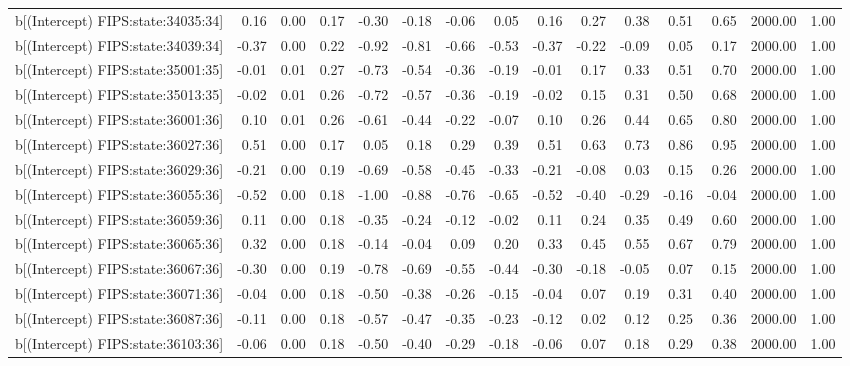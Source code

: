 \begin{table}[ht]
\begin{tabular}{rrrrrrrrrrrrrrr}
  b[(Intercept) FIPS:state:34035:34] & 0.16 & 0.00 & 0.17 & -0.30 & -0.18 & -0.06 & 0.05 & 0.16 & 0.27 & 0.38 & 0.51 & 0.65 & 2000.00 & 1.00 \\ 
  b[(Intercept) FIPS:state:34039:34] & -0.37 & 0.00 & 0.22 & -0.92 & -0.81 & -0.66 & -0.53 & -0.37 & -0.22 & -0.09 & 0.05 & 0.17 & 2000.00 & 1.00 \\ 
  b[(Intercept) FIPS:state:35001:35] & -0.01 & 0.01 & 0.27 & -0.73 & -0.54 & -0.36 & -0.19 & -0.01 & 0.17 & 0.33 & 0.51 & 0.70 & 2000.00 & 1.00 \\ 
  b[(Intercept) FIPS:state:35013:35] & -0.02 & 0.01 & 0.26 & -0.72 & -0.57 & -0.36 & -0.19 & -0.02 & 0.15 & 0.31 & 0.50 & 0.68 & 2000.00 & 1.00 \\ 
  b[(Intercept) FIPS:state:36001:36] & 0.10 & 0.01 & 0.26 & -0.61 & -0.44 & -0.22 & -0.07 & 0.10 & 0.26 & 0.44 & 0.65 & 0.80 & 2000.00 & 1.00 \\ 
  b[(Intercept) FIPS:state:36027:36] & 0.51 & 0.00 & 0.17 & 0.05 & 0.18 & 0.29 & 0.39 & 0.51 & 0.63 & 0.73 & 0.86 & 0.95 & 2000.00 & 1.00 \\ 
  b[(Intercept) FIPS:state:36029:36] & -0.21 & 0.00 & 0.19 & -0.69 & -0.58 & -0.45 & -0.33 & -0.21 & -0.08 & 0.03 & 0.15 & 0.26 & 2000.00 & 1.00 \\ 
  b[(Intercept) FIPS:state:36055:36] & -0.52 & 0.00 & 0.18 & -1.00 & -0.88 & -0.76 & -0.65 & -0.52 & -0.40 & -0.29 & -0.16 & -0.04 & 2000.00 & 1.00 \\ 
  b[(Intercept) FIPS:state:36059:36] & 0.11 & 0.00 & 0.18 & -0.35 & -0.24 & -0.12 & -0.02 & 0.11 & 0.24 & 0.35 & 0.49 & 0.60 & 2000.00 & 1.00 \\ 
  b[(Intercept) FIPS:state:36065:36] & 0.32 & 0.00 & 0.18 & -0.14 & -0.04 & 0.09 & 0.20 & 0.33 & 0.45 & 0.55 & 0.67 & 0.79 & 2000.00 & 1.00 \\ 
  b[(Intercept) FIPS:state:36067:36] & -0.30 & 0.00 & 0.19 & -0.78 & -0.69 & -0.55 & -0.44 & -0.30 & -0.18 & -0.05 & 0.07 & 0.15 & 2000.00 & 1.00 \\ 
  b[(Intercept) FIPS:state:36071:36] & -0.04 & 0.00 & 0.18 & -0.50 & -0.38 & -0.26 & -0.15 & -0.04 & 0.07 & 0.19 & 0.31 & 0.40 & 2000.00 & 1.00 \\ 
  b[(Intercept) FIPS:state:36087:36] & -0.11 & 0.00 & 0.18 & -0.57 & -0.47 & -0.35 & -0.23 & -0.12 & 0.02 & 0.12 & 0.25 & 0.36 & 2000.00 & 1.00 \\ 
  b[(Intercept) FIPS:state:36103:36] & -0.06 & 0.00 & 0.18 & -0.50 & -0.40 & -0.29 & -0.18 & -0.06 & 0.07 & 0.18 & 0.29 & 0.38 & 2000.00 & 1.00 \\ 

\end{tabular}
\end{table}
